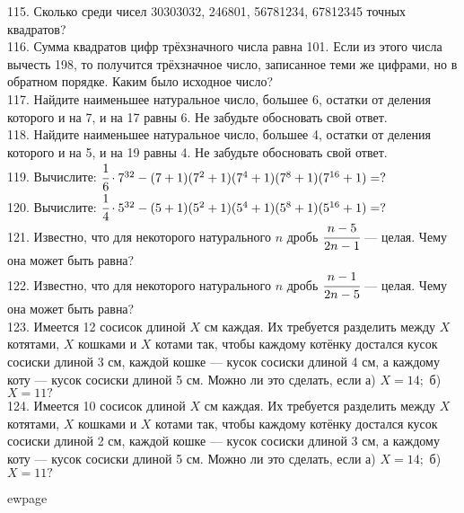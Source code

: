115. Сколько среди чисел 30303032, 246801, 56781234, 67812345 точных квадратов?\\
116. Сумма квадратов цифр трёхзначного числа равна 101. Если из этого числа вычесть 198, то получится трёхзначное число, записанное теми же цифрами, но в обратном порядке. Каким было исходное число?\\
117. Найдите наименьшее натуральное число, большее 6, остатки от деления которого и на 7, и на 17 равны 6. Не забудьте обосновать свой ответ.\\
118. Найдите наименьшее натуральное число, большее 4, остатки от деления которого и на 5, и на 19 равны 4. Не забудьте обосновать свой ответ.\\
119. Вычислите: $\cfrac{1}{6}\cdot 7^{32}-(7+1)(7^2+1)(7^4+1)(7^8+1)(7^{16}+1)=?$\\
120. Вычислите: $\cfrac{1}{4}\cdot 5^{32}-(5+1)(5^2+1)(5^4+1)(5^8+1)(5^{16}+1)=?$\\
121. Известно, что для некоторого натурального $n$ дробь $\cfrac{n - 5}{2n - 1}$ --- целая. Чему она может быть
равна?\\
122. Известно, что для некоторого натурального $n$ дробь $\cfrac{n - 1}{2n - 5}$ --- целая. Чему она может быть
равна?\\
123. Имеется 12 сосисок длиной $X$ см каждая. Их требуется разделить между $X$ котятами, $X$ кошками и $X$ котами так, чтобы каждому котёнку достался кусок сосиски длиной 3 см, каждой кошке ---
кусок сосиски длиной 4 см, а каждому коту --- кусок сосиски длиной 5 см. Можно ли это сделать, если а) $X = 14;$ б) $X = 11?$\\
124. Имеется 10 сосисок длиной $X$ см каждая. Их требуется разделить между $X$ котятами, $X$ кошками и $X$ котами так, чтобы каждому котёнку достался кусок сосиски длиной 2 см, каждой кошке ---
кусок сосиски длиной 3 см, а каждому коту --- кусок сосиски длиной 5 см. Можно ли это сделать, если а) $X = 14;$ б) $X = 11?$

ewpage
